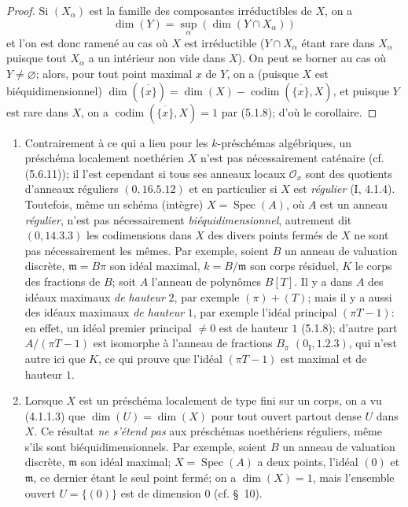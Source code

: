 \begin{proof}
Si $(X_\alpha)$ est la famille des composantes irréductibles de $X$, on a
\[
\dim(Y)=\sup_\alpha(\dim(Y\cap X_\alpha))
\]
et l'on est donc ramené au cas où $X$ est irréductible ($Y\cap X_\alpha$
étant rare dans $X_\alpha$ puisque tout $X_\alpha$ a un intérieur non vide
dans $X$). On peut se borner au cas où $Y\ne\varnothing$; alors, pour tout
point maximal $x$ de $Y$, on a (puisque $X$ est biéquidimensionnel)
$\dim(\overline{\{x\}})=\dim(X)-\operatorname{codim}(\overline{\{x\}},X)$,
et puisque $Y$ est rare dans $X$, on a
$\operatorname{codim}(\overline{\{x\}},X)=1$ par (5.1.8); d'où le corollaire.
\end{proof}

\begin{remarks}[5.2.5]
\label{IV.2.5.2.5-fr}
\begin{enumerate}
\item[(i)] Contrairement à ce qui a lieu pour les $k$-préschémas algébriques,
un préschéma localement noethérien $X$ n'est pas nécessairement caténaire
(cf. (5.6.11)); il l'est cependant si tous ses anneaux locaux $\mathcal O_x$
sont des quotients d'anneaux réguliers $(0,16.5.12)$ et en particulier si $X$
est \emph{régulier} (I, 4.1.4). Toutefois, même un schéma (intègre)
$X=\operatorname{Spec}(A)$, où $A$ est un anneau \emph{régulier}, n'est pas
nécessairement \emph{biéquidimensionnel}, autrement dit $(0,14.3.3)$ les
codimensions dans $X$ des divers points fermés de $X$ ne sont pas
nécessairement les mêmes. Par exemple, soient $B$ un anneau de valuation
discrète, $\mathfrak m=B\pi$ son idéal maximal, $k=B/\mathfrak m$ son corps
résiduel, $K$ le corps des fractions de $B$; soit $A$ l'anneau de polynômes
$B[T]$. Il y a dans $A$ des idéaux maximaux \emph{de hauteur} $2$, par exemple
$(\pi)+(T)$; mais il y a aussi des idéaux maximaux \emph{de hauteur} $1$, par
exemple l'idéal principal $(\pi T-1)$: en effet, un idéal premier principal
$\ne0$ est de hauteur $1$ (5.1.8); d'autre part
$A/(\pi T-1)$ est isomorphe à l'anneau de fractions $B_\pi$
$(0_{\mathrm I},1.2.3)$, qui n'est autre ici que $K$, ce qui prouve que
l'idéal $(\pi T-1)$ est maximal et de hauteur $1$.

\item[(ii)] Lorsque $X$ est un préschéma localement de type fini sur un corps,
on a vu (4.1.1.3) que $\dim(U)=\dim(X)$ pour tout ouvert partout dense $U$
dans $X$. Ce résultat \emph{ne s'étend pas} aux préschémas noethériens
réguliers, même s'ils sont biéquidimensionnels. Par exemple, soient $B$ un
anneau de valuation discrète, $\mathfrak m$ son idéal maximal;
$X=\operatorname{Spec}(A)$ a deux points, l'idéal $(0)$ et $\mathfrak m$, ce
dernier étant le seul point fermé; on a $\dim(X)=1$, mais l'ensemble ouvert
$U=\{(0)\}$ est de dimension $0$ (cf. \S~10).
\end{enumerate}
\end{remarks}

